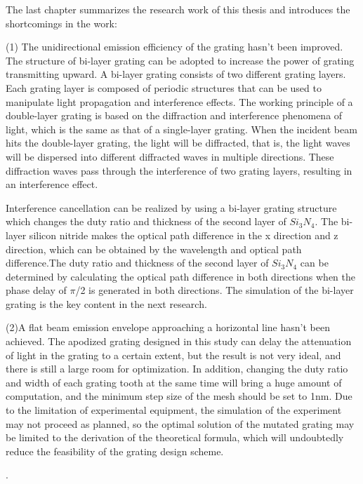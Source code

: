 \documentclass[UTF8,a4paper,12pt]{ctexart}
\numberwithin{equation}{section}
\begin{document}
The last chapter summarizes the research work of this thesis and introduces the shortcomings in the work:

(1) The unidirectional emission efficiency of the grating  hasn't been improved. The structure of bi-layer grating can be adopted to increase the power of grating transmitting upward. A bi-layer grating consists of two different grating layers. Each grating layer is composed of periodic structures that can be used to manipulate light propagation and interference effects. The working principle of a double-layer grating is based on the diffraction and interference phenomena of light, which is the same as that of a single-layer grating. When the incident beam hits the double-layer grating, the light will be diffracted, that is, the light waves will be dispersed into different diffracted waves in multiple directions. These diffraction waves pass through the interference of two grating layers, resulting in an interference effect.



Interference cancellation can be realized by using a bi-layer grating structure which changes the duty ratio and thickness of the second layer of $Si_3N_4$. The bi-layer silicon nitride makes the optical path difference in the x direction and z direction, which can be obtained by the wavelength and optical path difference.The duty ratio and thickness of the second layer of $Si_3N_4$ can be determined by calculating the optical path difference in both directions when the phase delay of $\pi$/2 is generated in both directions. The simulation of the bi-layer grating is the key content in the next research.

(2)A flat beam emission envelope approaching a horizontal line hasn't been achieved. The apodized grating designed in this study can delay the attenuation of light in the grating to a certain extent, but the result is not very ideal, and there is still a large room for optimization. In addition, changing the duty ratio and width of each grating tooth at the same time will bring a huge amount of computation, and the minimum step size of the mesh should be set to 1nm. Due to the limitation of experimental equipment, the simulation of the experiment may not proceed as planned, so the optimal solution of the mutated grating may be limited to the derivation of the theoretical formula, which will undoubtedly reduce the feasibility of the grating design scheme.
















.%
\end{document}
